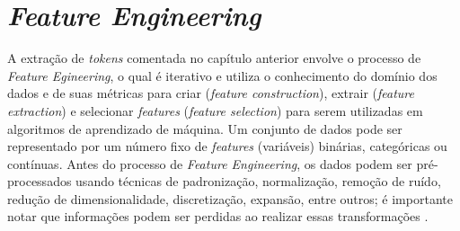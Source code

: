 \documentclass[
	12pt,				%
	oneside,			%
	a4paper,			%
	english,			%
	brazil				%
	]{abntex2ppgsi}
\begin{document}
{\section{\textit{Feature Engineering}}
\label{featuresEng}




A extração de \textit{tokens} comentada no capítulo anterior envolve o processo de \textit{Feature Egineering}, o qual é iterativo e utiliza o conhecimento do domínio dos dados e de suas métricas para criar (\textit{feature construction}), extrair (\textit{feature extraction}) e selecionar \textit{features} (\textit{feature selection}) para serem utilizadas em algoritmos de aprendizado de máquina. Um conjunto de dados pode ser representado por um número fixo de \textit{features} (variáveis) binárias, categóricas ou contínuas. Antes do processo de \textit{Feature Engineering}, os dados podem ser pré-processados %
usando técnicas de padronização, normalização, remoção de ruído, redução de dimensionalidade, discretização, expansão, entre outros; é importante notar que informações podem ser perdidas ao realizar essas transformações \cite{guyon2006introduction}.

}
\end{document}
